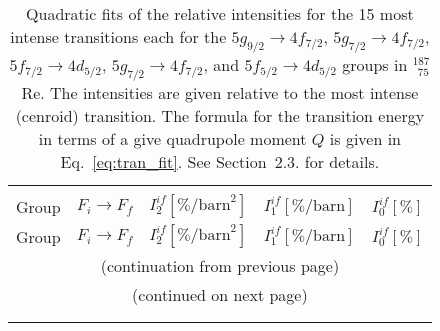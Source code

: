 %
\begin{longtable}{cc|rrr}
\caption{\label{tab:re187intens}%
Quadratic fits of the relative intensities for the 15 most intense transitions each for the $5g_{9/2}\rightarrow4f_{7/2}$, $5g_{7/2}\rightarrow4f_{7/2}$, $5f_{7/2}\rightarrow4d_{5/2}$, $5g_{7/2}\rightarrow4f_{7/2}$, and $5f_{5/2}\rightarrow4d_{5/2}$ groups in $^{187}_{\;\,75}$Re. The intensities are given relative to the most intense (cenroid) transition. The formula for the transition energy in terms of a give quadrupole moment $Q$ is given in Eq.~\eqref{eq:tran_fit}. See Section~2.3. for details.}
\\\hline\\[-10pt]\hline\\[-10pt]
\centering
Group& $F_i \rightarrow F_f$ & $I_2^{if} [\%\text{/barn}^2]$ & $I_1^{if} [\%\text{/barn}]$ & $I_0^{if} [\%]$\\[1pt]\hline
\endfirsthead

Group& $F_i \rightarrow F_f$ & $I_2^{if} [\%\text{/barn}^2]$ & $I_1^{if} [\%\text{/barn}]$ & $I_0^{if} [\%]$\\[1pt]\hline
\multicolumn{5}{c}{{(continuation from previous page)}}\\
\endhead

\multicolumn{5}{c}{{(continued on next page)}}\\ \endfoot
\hline \\[-10pt] \hline
\endlastfoot


\end{longtable}
